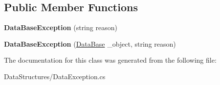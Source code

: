 \subsection*{Public Member Functions}
\begin{DoxyCompactItemize}
\item 
\hypertarget{class_dwarf_d_b_1_1_data_structures_1_1_data_base_exception_ac31189f613083b06927c5b7b62a5415a}{
{\bfseries DataBaseException} (string reason)}
\label{class_dwarf_d_b_1_1_data_structures_1_1_data_base_exception_ac31189f613083b06927c5b7b62a5415a}

\item 
\hypertarget{class_dwarf_d_b_1_1_data_structures_1_1_data_base_exception_a92e1a400cd2702fd38385c374478981e}{
{\bfseries DataBaseException} (\hyperlink{class_dwarf_d_b_1_1_data_structures_1_1_data_base}{DataBase} \_\-object, string reason)}
\label{class_dwarf_d_b_1_1_data_structures_1_1_data_base_exception_a92e1a400cd2702fd38385c374478981e}

\end{DoxyCompactItemize}


The documentation for this class was generated from the following file:\begin{DoxyCompactItemize}
\item 
DataStructures/DataException.cs\end{DoxyCompactItemize}
